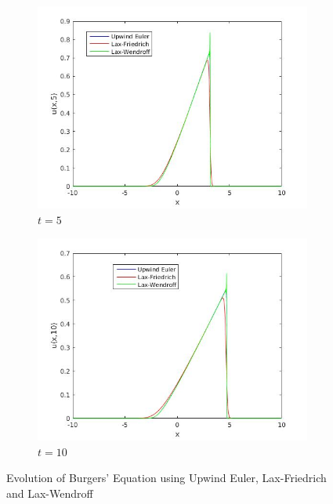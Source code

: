 \begin{figure}[H]
\begin{subfigure}[b]{0.45\textwidth}
  \includegraphics[width=\textwidth]{Images/8_ull_3.jpg}
  \caption{$t=5$}
\end{subfigure}
\begin{subfigure}[b]{0.45\textwidth}
  \includegraphics[width=\textwidth]{Images/8_ull_4.jpg}
  \caption{$t=10$}
\end{subfigure}
\caption{Evolution of Burgers' Equation using Upwind Euler, Lax-Friedrich and Lax-Wendroff}
\label{fig:burger_ull}
\end{figure}
